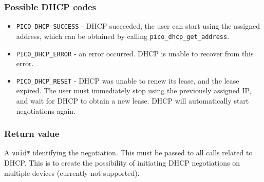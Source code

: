 \subsubsection*{Possible DHCP codes}
\begin{itemize}[noitemsep]
\item \texttt{PICO\_DHCP\_SUCCESS} - DHCP succeeded, the user can start using the assigned address,
which can be obtained by calling \texttt{pico\_dhcp\_get\_address}.
\item \texttt{PICO\_DHCP\_ERROR} - an error occurred. DHCP is unable to recover from this error.
\item \texttt{PICO\_DHCP\_RESET} - DHCP was unable to renew its lease, and the lease expired.
The user must immediately stop using the previously assigned IP, and wait for DHCP to obtain a
new lease. DHCP will automatically start negotiations again.
\end{itemize}

\subsubsection*{Return value}
A \texttt{void*} identifying the negotiation. This must be passed to all calls related to DHCP.
This is to create the possibility of initiating DHCP negotiations on multiple devices (currently not supported).


